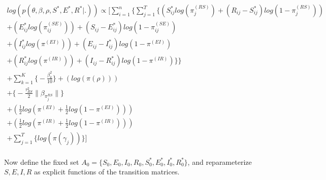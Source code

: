 \documentclass[12pt]{article}
\begin{document}
\begin{center}
\begin{multline}
\displaystyle
log(p(\theta,\beta,\rho,S^*,E^*,R^*|.)) \propto \Bigg[ 
    \sum_{i=1}^n \bigg\{ \sum_{j=1}^T
        \Big\{
            (S^*_{ij}log(\pi_j^{(RS)}) + (R_{ij} - S^*_{ij})log(1-\pi_j^{(RS)})) \\
            + (E^*_{ij}log(\pi_{ij}^{(SE)})) + (S_{ij} - E^*_{ij})log(1-\pi_{ij}^{(SE)}) \\
            + (I^*_{ij}log(\pi^{(EI)})) + (E_{ij} - I^*_{ij})log(1-\pi^{(EI)}) \\
            + (R^*_{ij}log(\pi^{(IR)})) + (I_{ij} - R^*_{ij})log(1-\pi^{(IR)}) \Big\}\bigg\} \\
    + \sum_{k = 1}^K\bigg\{-\frac{\beta^2_k}{10}\bigg\}
            + (log(\pi(\rho)))\\
            +  \bigg\{ -\frac{\tau^2_{RS}}{2}\|\beta_{\pi_j^{RS}}\|  \bigg\} \\ 
            + (\frac{1}{2}log(\pi^{(EI)} + \frac{1}{2}log(1-\pi^{(EI)}))) \\
            + (\frac{1}{2}log(\pi^{(IR)} + \frac{1}{2}log(1-\pi^{(IR)}))) \\
            + \sum_{j=1}^{T} \bigg\{ log(\pi(\gamma_j)) \bigg\}\Bigg]\\
\end{multline}
\end{center}

Now define the fixed set $A_0 = \{S_0, E_0, I_0, R_0, S^*_0, E^*_0, I^*_0, R^*_0\}$,
and reparameterize $S, E, I, R$ as explicit functions of the transition matrices. 
\end{document}
